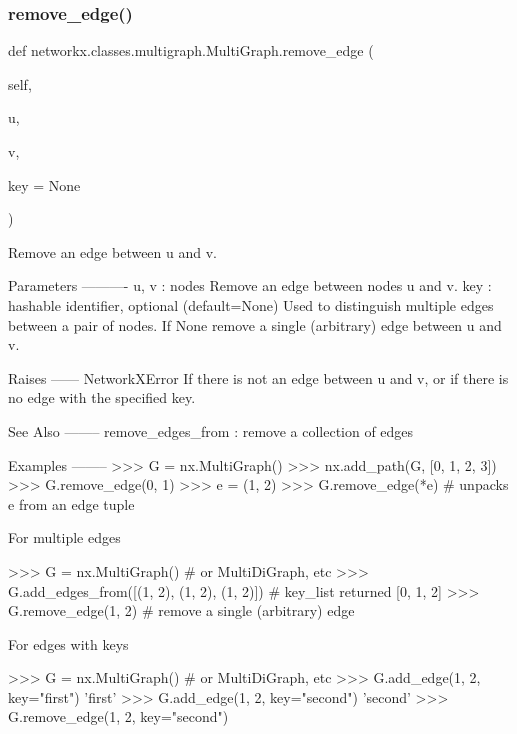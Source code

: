 \subsubsection{\texorpdfstring{remove\+\_\+edge()}{remove\_edge()}}
{\footnotesize\ttfamily def networkx.\+classes.\+multigraph.\+Multi\+Graph.\+remove\+\_\+edge (\begin{DoxyParamCaption}\item[{}]{self,  }\item[{}]{u,  }\item[{}]{v,  }\item[{}]{key = {\ttfamily None} }\end{DoxyParamCaption})}

\begin{DoxyVerb}Remove an edge between u and v.

Parameters
----------
u, v : nodes
    Remove an edge between nodes u and v.
key : hashable identifier, optional (default=None)
    Used to distinguish multiple edges between a pair of nodes.
    If None remove a single (arbitrary) edge between u and v.

Raises
------
NetworkXError
    If there is not an edge between u and v, or
    if there is no edge with the specified key.

See Also
--------
remove_edges_from : remove a collection of edges

Examples
--------
>>> G = nx.MultiGraph()
>>> nx.add_path(G, [0, 1, 2, 3])
>>> G.remove_edge(0, 1)
>>> e = (1, 2)
>>> G.remove_edge(*e)  # unpacks e from an edge tuple

For multiple edges

>>> G = nx.MultiGraph()  # or MultiDiGraph, etc
>>> G.add_edges_from([(1, 2), (1, 2), (1, 2)])  # key_list returned
[0, 1, 2]
>>> G.remove_edge(1, 2)  # remove a single (arbitrary) edge

For edges with keys

>>> G = nx.MultiGraph()  # or MultiDiGraph, etc
>>> G.add_edge(1, 2, key="first")
'first'
>>> G.add_edge(1, 2, key="second")
'second'
>>> G.remove_edge(1, 2, key="second")\end{DoxyVerb}
 \mbox{\label{classnetworkx_1_1classes_1_1multigraph_1_1MultiGraph_af98830a4639ab324205c8cb6f5a6204a}} 
